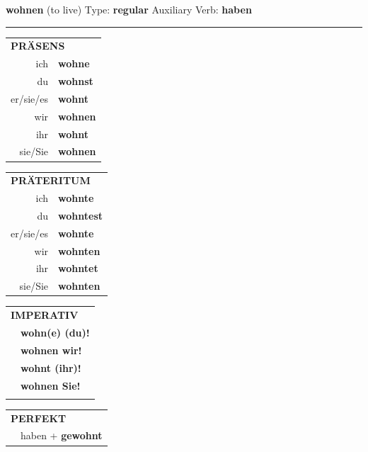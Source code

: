 \documentclass[10pt,a4paper]{revtex4-2}
\begin{document}
\begin{verbbox}
    {\Large \bf wohnen} (to live) \hfill Type: \textbf{regular} \hfill Auxiliary Verb: \textbf{haben} 
    
     \vspace{5pt}

    \hrule
    
    \vspace{5pt}

  \begin{tabular}{rl}
     \multicolumn{2}{l}{\textbf{PRÄSENS} }\\
    ich & \textbf{wohne}\\
    du & \textbf{wohnst}\\
    er/sie/es & \textbf{wohnt}\\
    wir & \textbf{wohnen}\\
    ihr & \textbf{wohnt}\\
    sie/Sie & \textbf{wohnen}\\
  \end{tabular}
  \hfill
     \begin{tabular}{rl}
    \multicolumn{2}{l}{\textbf{PRÄTERITUM} }\\
    ich & \textbf{wohnte}\\
    du & \textbf{wohntest}\\
    er/sie/es & \textbf{wohnte}\\
    wir & \textbf{wohnten}\\
    ihr & \textbf{wohntet}\\
    sie/Sie & \textbf{wohnten}\\
  \end{tabular}
  \hfill
  \begin{tabular}{rl}
     \multicolumn{2}{l}{\textbf{IMPERATIV} }\\
   & \textbf{wohn(e) (du)!}\\
   & \textbf{wohnen wir!}\\
   & \textbf{wohnt (ihr)!}\\
   & \textbf{wohnen Sie!}\\
   & \vspace{10pt}
  \end{tabular}

    \vspace{10pt}

 \begin{tabular}{rl}
     \multicolumn{2}{l}{\textbf{PERFEKT}}\\
   & haben + \textbf{gewohnt}\\
  \end{tabular}
\hfill
   \begin{tabular}{rl}
   

\end{tabular}
\end{verbbox}
\end{document}
